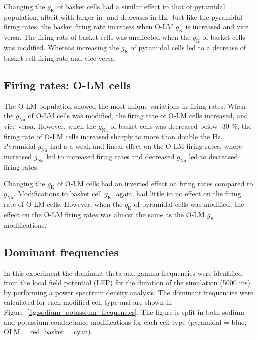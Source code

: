 Changing the \(g_{\text{K}}\) of basket cells had a similar effect to that of pyramidal population, albeit with larger in- and decreases in Hz.
Just like the pyramidal firing rates, the basket firing rate increases when O-LM \(g_{\text{K}}\) is increased and vice versa.
The firing rate of basket cells was unaffected when the \(g_{\text{K}}\) of basket cells was modified.
Whereas increasing the \(g_{\text{K}}\) of pyramidal cells led to a decrease of basket cell firing rate and vice versa.

\subsection{Firing rates: O-LM cells}
The O-LM population showed the most unique variations in firing rates.
When the \(g_{\text{Na}}\) of O-LM cells was modified, the firing rate of O-LM cells increased, and vice versa.
However, when the \(g_{\text{Na}}\) of basket cells was decreased below -30 \%, the firing rate of O-LM cells increased sharply to more than double the Hz.
Pyramidal \(g_{\text{Na}}\) had a a weak and linear effect on the O-LM firing rates, where increased \(g_{\text{Na}}\) led to increased firing rates and decreased \(g_{\text{Na}}\) led to decreased firing rates.

Changing the \(g_{\text{K}}\) of O-LM cells had an inverted effect on firing rates compared to \(g_{\text{Na}}\).
Modifications to basket cell \(g_{\text{K}}\), again, had little to no effect on the firing rate of O-LM cells.
However, when the \(g_{\text{K}}\) of pyramidal cells was modified, the effect on the O-LM firing rates was almost the same as the O-LM \(g_{\text{K}}\) modifications.
\pagebreak

\subsection{Dominant frequencies}
In this experiment the dominant theta and gamma frequencies were identified from the local field potential (LFP) for the duration of the simulation (5000 ms) by performing a power spectrum density analysis.
The dominant frequencies were calculated for each modified cell type and are shown in Figure~\ref{fig:sodium_potassium_frequencies}.
The figure is split in both sodium and potassium conductance modifications for each cell type (pyramidal = blue, OLM = red, basket = cyan).

